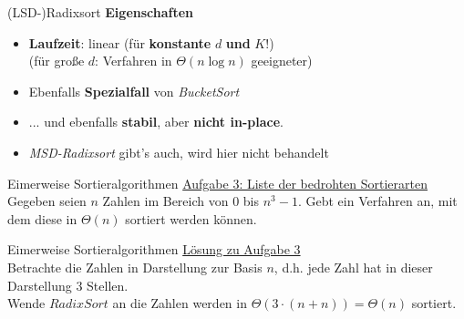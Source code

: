 \begin{frame}{(LSD-)Radixsort}
	\textbf{Eigenschaften}   
	\begin{itemize}
		\item \textbf{Laufzeit}: linear (für \textbf{konstante} $d$ \textbf{und} $K$!) \\
		\pause
		(für große $d$: Verfahren in $\Theta(n \log n)$ geeigneter)
		\pause
		\item Ebenfalls \textbf{Spezialfall} von \emph{BucketSort}
		\pause
		\item ... und ebenfalls \textbf{stabil}, aber \textbf{nicht in-place}.
		\pause
		\item \emph{MSD-Radixsort} gibt's auch, wird hier nicht behandelt
	\end{itemize}
\end{frame}

\begin{frame}{Eimerweise Sortieralgorithmen}
	\underline{Aufgabe 3: Liste der bedrohten Sortierarten} \\
	Gegeben seien $n$ Zahlen im Bereich von $0$ bis $n^3 - 1$. Gebt ein Verfahren an, mit dem diese in $\Theta(n)$ sortiert werden können.
\end{frame}

\begin{frame}{Eimerweise Sortieralgorithmen}
	\underline{Lösung zu Aufgabe 3} \\
	Betrachte die Zahlen in Darstellung zur Basis $n$, d.h. jede Zahl hat in dieser Darstellung 3 Stellen. \\ 
	Wende $RadixSort$ an \impl die Zahlen werden in $\Theta(3 \cdot (n + n)) = \Theta(n)$ sortiert.
\end{frame}

